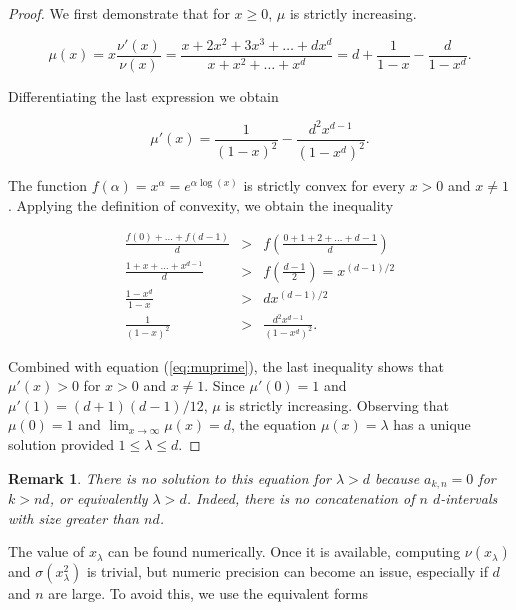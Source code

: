 \documentclass{article}
\newtheorem*{remark}{Remark}
\begin{document}
\begin{proof}
We first demonstrate that for $x \geq 0$, $\mu$ is strictly increasing.

\begin{equation}
\label{eq:mu}
\mu(x) = x\frac{\nu'(x)}{\nu(x)} =
\frac{x+2x^2+3x^3+\ldots+dx^d}{x+x^2+\ldots+x^d} =
d+\frac{1}{1-x} - \frac{d}{1-x^d}.
\end{equation} 

Differentiating the last expression we obtain

\begin{equation}
\label{eq:muprime}
\mu'(x) = \frac{1}{(1-x)^2} -\frac{d^2x^{d-1}}{(1-x^d)^2}.
\end{equation}

The function $f(\alpha) = x^{\alpha} = e^{\alpha \log(x)}$ is strictly
convex for every $x > 0$ and $x \neq 1$. Applying the definition of
convexity, we obtain the inequality

\begin{eqnarray*}
\frac{f(0)+\ldots+f(d-1)}{d} &>&
f\left(\frac{0+1+2+\ldots+d-1}{d}\right) \\
\frac{1+x+\ldots+x^{d-1}}{d} &>& f\left(\frac{d-1}{2}\right)
= x^{(d-1)/2} \\
\frac{1-x^d}{1-x} &>& dx^{(d-1)/2} \\
\frac{1}{(1-x)^2} &>& \frac{d^2x^{d-1}}{(1-x^d)^2}.
\end{eqnarray*}

Combined with equation (\ref{eq:muprime}), the last inequality shows that
$\mu'(x) > 0$ for $x > 0$ and $x \neq 1$. Since $\mu'(0) = 1$ and $\mu'(1)
= (d+1)(d-1)/12$, $\mu$ is strictly increasing. Observing that $\mu(0) =
1$ and $\lim_{x\rightarrow\infty} \mu(x) = d$, the equation $\mu(x) =
\lambda$ has a unique solution provided $1 \leq \lambda \leq d$.
\end{proof}

\begin{remark}
There is no solution to this equation for $\lambda > d$ because $a_{k,n} =
0$ for $k > nd$, or equivalently $\lambda > d$. Indeed, there is no
concatenation of $n$ $d$-intervals with size greater than $nd$.
\end{remark}


The value of $x_\lambda$ can be found numerically. Once it is available,
computing $\nu(x_\lambda)$ and $\sigma(x_\lambda^2)$ is trivial, but
numeric precision can become an issue, especially if $d$ and $n$ are
large. To avoid this, we use the equivalent forms
\end{document}
